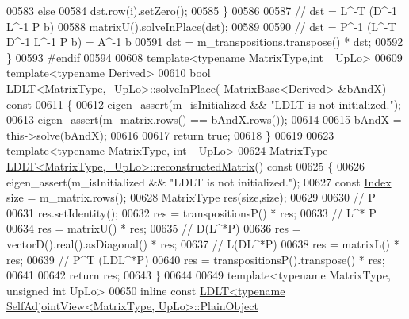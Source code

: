 \begin{DoxyCode}
00583     \textcolor{keywordflow}{else}
00584       dst.row(i).setZero();
00585   \}
00586 
00587   \textcolor{comment}{// dst = L^-T (D^-1 L^-1 P b)}
00588   matrixU().solveInPlace(dst);
00589 
00590   \textcolor{comment}{// dst = P^-1 (L^-T D^-1 L^-1 P b) = A^-1 b}
00591   dst = m\_transpositions.transpose() * dst;
00592 \}
00593 \textcolor{preprocessor}{#endif}
00594 
00608 \textcolor{keyword}{template}<\textcolor{keyword}{typename} MatrixType,\textcolor{keywordtype}{int} \_UpLo>
00609 \textcolor{keyword}{template}<\textcolor{keyword}{typename} Derived>
00610 \textcolor{keywordtype}{bool} \hyperlink{group___cholesky___module_class_eigen_1_1_l_d_l_t}{LDLT<MatrixType,\_UpLo>::solveInPlace}(
      \hyperlink{group___core___module_class_eigen_1_1_matrix_base}{MatrixBase<Derived>} &bAndX)\textcolor{keyword}{ const}
00611 \textcolor{keyword}{}\{
00612   eigen\_assert(m\_isInitialized && \textcolor{stringliteral}{"LDLT is not initialized."});
00613   eigen\_assert(m\_matrix.rows() == bAndX.rows());
00614 
00615   bAndX = this->solve(bAndX);
00616 
00617   \textcolor{keywordflow}{return} \textcolor{keyword}{true};
00618 \}
00619 
00623 \textcolor{keyword}{template}<\textcolor{keyword}{typename} MatrixType, \textcolor{keywordtype}{int} \_UpLo>
\hyperlink{group___cholesky___module_ae3693372ca29f50d87d324dfadaae148}{00624} MatrixType \hyperlink{group___cholesky___module_ae3693372ca29f50d87d324dfadaae148}{LDLT<MatrixType,\_UpLo>::reconstructedMatrix}()\textcolor{keyword}{ const}
00625 \textcolor{keyword}{}\{
00626   eigen\_assert(m\_isInitialized && \textcolor{stringliteral}{"LDLT is not initialized."});
00627   \textcolor{keyword}{const} \hyperlink{group___cholesky___module_ad9c57eb2fb3bbccd51b9d2e111bea355}{Index} size = m\_matrix.rows();
00628   MatrixType res(size,size);
00629 
00630   \textcolor{comment}{// P}
00631   res.setIdentity();
00632   res = transpositionsP() * res;
00633   \textcolor{comment}{// L^* P}
00634   res = matrixU() * res;
00635   \textcolor{comment}{// D(L^*P)}
00636   res = vectorD().real().asDiagonal() * res;
00637   \textcolor{comment}{// L(DL^*P)}
00638   res = matrixL() * res;
00639   \textcolor{comment}{// P^T (LDL^*P)}
00640   res = transpositionsP().transpose() * res;
00641 
00642   \textcolor{keywordflow}{return} res;
00643 \}
00644 
00649 \textcolor{keyword}{template}<\textcolor{keyword}{typename} MatrixType, \textcolor{keywordtype}{unsigned} \textcolor{keywordtype}{int} UpLo>
00650 \textcolor{keyword}{inline} \textcolor{keyword}{const} \hyperlink{group___cholesky___module_class_eigen_1_1_l_d_l_t}{LDLT<typename SelfAdjointView<MatrixType, UpLo>::PlainObject}

\end{DoxyCode}
